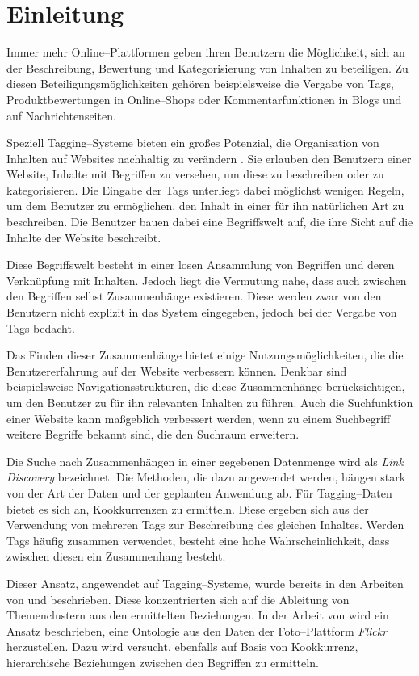 \chapter{Einleitung}

Immer mehr Online--Plattformen geben ihren Benutzern die Möglichkeit, sich an der Beschreibung, Bewertung und Kategorisierung von Inhalten zu beteiligen. Zu diesen Beteiligungsmöglichkeiten gehören beispielsweise die Vergabe von Tags, Produktbewertungen in Online--Shops oder Kommentarfunktionen in Blogs und auf Nachrichtenseiten. 

Speziell Tagging--Systeme bieten ein großes Potenzial, die Organisation von Inhalten auf Websites nachhaltig zu verändern \cite{sc2005}. Sie erlauben den Benutzern einer Website, Inhalte mit Begriffen zu versehen, um diese zu beschreiben oder zu kategorisieren. Die Eingabe der Tags unterliegt dabei möglichst wenigen Regeln, um dem Benutzer zu ermöglichen, den Inhalt in einer für ihn natürlichen Art zu beschreiben. Die Benutzer bauen dabei eine Begriffswelt auf, die ihre Sicht auf die Inhalte der Website beschreibt.

Diese Begriffswelt besteht in einer losen Ansammlung von Begriffen und deren Verknüpfung mit Inhalten. Jedoch liegt die Vermutung nahe, dass auch zwischen den Begriffen selbst Zusammenhänge existieren. Diese werden zwar von den Benutzern nicht explizit in das System eingegeben, jedoch bei der Vergabe von Tags bedacht.

Das Finden dieser Zusammenhänge bietet einige Nutzungsmöglichkeiten, die die Benutzererfahrung auf der Website verbessern können. Denkbar sind beispielsweise Navigationsstrukturen, die diese Zusammenhänge berücksichtigen, um den Benutzer zu für ihn relevanten Inhalten zu führen. Auch die Suchfunktion einer Website kann maßgeblich verbessert werden, wenn zu einem Suchbegriff weitere Begriffe bekannt sind, die den Suchraum erweitern.

Die Suche nach Zusammenhängen in einer gegebenen Datenmenge wird als \emph{Link Discovery} bezeichnet. Die Methoden, die dazu angewendet werden, hängen stark von der Art der Daten und der geplanten Anwendung ab. Für Tagging--Daten bietet es sich an, Kookkurrenzen zu ermitteln. Diese ergeben sich aus der Verwendung von mehreren Tags zur Beschreibung des gleichen Inhaltes. Werden Tags häufig zusammen verwendet, besteht eine hohe Wahrscheinlichkeit, dass zwischen diesen ein Zusammenhang besteht. 

Dieser Ansatz, angewendet auf Tagging--Systeme, wurde bereits in den Arbeiten von \textcite{ps2006} und \textcite{kss2010} beschrieben. Diese konzentrierten sich auf die Ableitung von Themenclustern aus den ermittelten Beziehungen. In der Arbeit von \textcite{ps2006} wird ein Ansatz beschrieben, eine Ontologie aus den Daten der Foto--Plattform \emph{Flickr} herzustellen. Dazu wird versucht, ebenfalls auf Basis von Kookkurrenz, hierarchische Beziehungen zwischen den Begriffen zu ermitteln.

